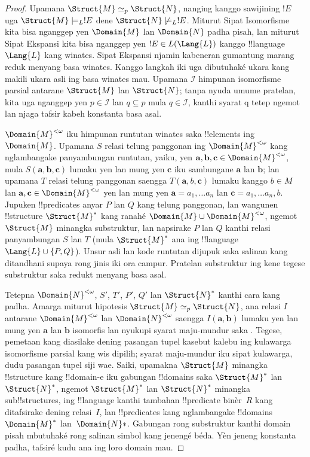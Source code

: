 \documentclass[../../../include/open-logic-section]{subfiles}
\begin{document}
\begin{proof}
Upamana $\Struct{M} \simeq_p \Struct{N}$, nanging kanggo sawijining
$!E$ uga $\Struct{M} \models_L !E$ dene $\Struct{N}
\not\models_L !E$. Miturut Sipat Isomorfisme kita bisa nganggep
yen $\Domain{M}$ lan $\Domain{N}$ padha pisah, lan miturut Sipat
Ekspansi kita bisa nganggep yen $!E \in L(\Lang{L})$ kanggo
!!{language}~$\Lang{L}$ kang winates. Sipat Ekspansi njamin kabeneran gumantung marang reduk menyang basa winates. Kanggo langkah iki uga dibutuhaké ukara kang makili ukara asli ing basa winates mau. Upamana $\mathcal{I}$
himpunan isomorfisme parsial antarane $\Struct{M}$ lan
$\Struct{N}$; tanpa nyuda umume pratelan, kita uga nganggep yen
$p \in \mathcal{I}$ lan $q \subseteq p$ mula $q \in \mathcal{I}$, kanthi syarat q tetep ngemot lan njaga tafsir kabeh konstanta basa asal.

$\Domain{M}^{<\omega}$ iku himpunan runtutan winates saka
!!{element}s ing~$\Domain{M}$. Upamana $S$ relasi telung panggonan
ing $\Domain{M}^{<\omega}$ kang nglambangake panyambungan runtutan,
yaiku, yen $\mathbf{a}, \mathbf{b}, \mathbf{c} \in
\Domain{M}^{<\omega}$, mula $S(\mathbf{a}, \mathbf{b},
\mathbf{c})$ lumaku yen lan mung yen $\mathbf{c}$ iku
sambungane $\mathbf{a}$ lan $\mathbf{b}$; lan upamana $T$
relasi telung panggonan saengga $T(\mathbf{a}, b, \mathbf{c})$
lumaku kanggo $b \in M$ lan $\mathbf{a}, \mathbf{c} \in
\Domain{M}^{<\omega}$ yen lan mung yen $\mathbf{a} =
a_1, \dots a_n$ lan $\mathbf{c} = a_1, \dots a_n, b$.
Jupuken !!{predicate}s anyar $P$ lan $Q$ kang telung panggonan,
lan wangunen !!{structure} $\Struct{M}^*$ kang ranahé
$\Domain{M} \cup \Domain{M}^{<\omega}$, ngemot
$\Struct{M}$ minangka substruktur, lan napsirake $P$ lan
$Q$ kanthi relasi panyambungan $S$ lan $T$ (mula
$\Struct{M}^*$ ana ing !!{language} $\Lang{L} \cup \{ P, Q\}$). Unsur asli lan kode runtutan dijupuk saka salinan kang ditandhani supaya rong jinis iki ora campur. Pratelan substruktur ing kene tegese substruktur saka redukt menyang basa asal.

Tetepna $\Domain{N}^{<\omega}$, $S'$, $T'$, $P'$, $Q'$
lan $\Struct{N}^*$ kanthi cara kang padha. Amarga miturut
hipotesis $\Struct{M} \simeq_p \Struct{N}$, ana relasi $I$
antarane $\Domain{M}^{<\omega}$ lan $\Domain{N}^{<\omega}$
saengga $I(\mathbf{a}, \mathbf{b})$ lumaku yen lan mung yen
$\mathbf{a}$ lan $\mathbf{b}$ isomorfis lan nyukupi syarat
maju-mundur saka . Tegese, pemetaan kang diasilake dening pasangan tupel kasebut kalebu ing kulawarga isomorfisme parsial kang wis dipilih; syarat maju-mundur iku sipat kulawarga, dudu pasangan tupel siji wae. Saiki,
upamakna $\Struct{M}$ minangka !!{structure} kang !!{domain}-e
iku gabungan !!{domain}s saka $\Struct{M}^*$ lan
$\Struct{N}^*$, ngemot $\Struct{M}^*$ lan $\Struct{N}^*$
minangka sub!!{structure}s, ing !!{language} kanthi tambahan
!!{predicate} binèr~$R$ kang ditafsirake dening relasi~$I$,
lan !!{predicate}s kang nglambangake !!{domain}s
$\Domain{M}^*$ lan~$\Domain{N}*$. Gabungan rong substruktur kanthi domain pisah mbutuhaké rong salinan simbol kang jenengé béda. Yèn jeneng konstanta padha, tafsiré kudu ana ing loro domain mau.


\end{proof}
\end{document}
